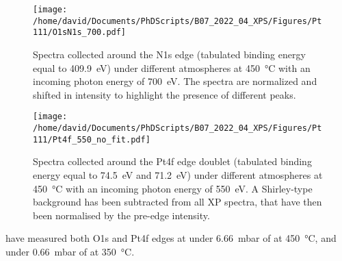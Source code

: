 \begin{figure}[!htb]
    \centering
    \texttt{[image: /home/david/Documents/PhDScripts/B07\_2022\_04\_XPS/Figures/Pt111/O1sN1s\_700.pdf]}
    \caption{
        Spectra collected around the N1s edge (tabulated binding energy equal to \qty{409.9}{\eV}) under different atmospheres at \qty{450}{\degreeCelsius} with an incoming photon energy of \qty{700}{\eV}.
        The spectra are normalized and shifted in intensity to highlight the presence of different peaks.
    }
    \label{fig:O1sN1sPt111}
\end{figure}

\begin{figure}[!htb]
    \centering
    \texttt{[image: /home/david/Documents/PhDScripts/B07\_2022\_04\_XPS/Figures/Pt111/Pt4f\_550\_no\_fit.pdf]}
    \caption{
        Spectra collected around the Pt4f edge doublet (tabulated binding energy equal to \qty{74.5}{\eV} and \qty{71.2}{\eV}) under different atmospheres at \qty{450}{\degreeCelsius} with an incoming photon energy of \qty{550}{\eV}.
        A Shirley-type background has been subtracted from all XP spectra, that have then been normalised by the pre-edge intensity.
    }
    \label{fig:Pt4fPt111}
\end{figure}



\cite{Miller2011} have measured both O1s and Pt4f edges at under \qty{6.66}{\milli\bar} of \dioxygen at \qty{450}{\degreeCelsius}, and under \qty{0.66}{\milli\bar} of \dioxygen at \qty{350}{\degreeCelsius}.